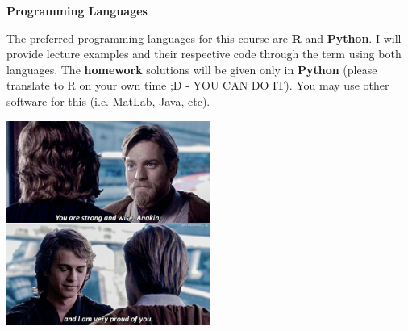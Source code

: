 \documentclass[8pt]{beamer}
\begin{document}
\begin{frame}
\textbf{Programming Languages}

\vspace{2mm}

The preferred programming languages for this course are \textbf{R} and \textbf{Python}. I will provide lecture examples and their respective code through the term using both languages. The \textbf{homework} solutions will be given only in \textbf{Python} (please translate to R on your own time ;D - YOU CAN DO IT). You may use other software for this (i.e. MatLab, Java, etc).

\begin{center}
\includegraphics[width=0.5\textwidth]{starwars_meme_1.jpg}
\end{center}
\end{frame}
\end{document}
